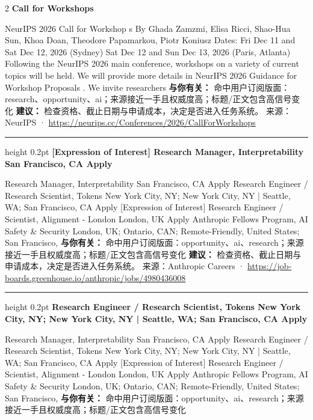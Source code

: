 \documentclass[10.5pt]{ctexart}
\begin{document}
\begin{multicols}{2}
{\large\bfseries Call for Workshops}\par
NeurIPS 2026 Call for Workshop s By Ghada Zamzmi, Elisa Ricci, Shao-Hua Sun, Khoa Doan, Theodore Papamarkou, Piotr Koniusz Dates: Fri Dec 11 and Sat Dec 12, 2026 (Sydney) Sat Dec 12 and Sun Dec 13, 2026 (Paris, Atlanta) Following the NeurIPS 2026 main conference, workshops on a variety of current topics will be held. We will provide more details in NeurIPS 2026 Guidance for Workshop Proposals . We invite researchers 
\textbf{与你有关：} 命中用户订阅版面：research、opportunity、ai；来源接近一手且权威度高；标题/正文包含高信号变化
\textbf{建议：} 检查资格、截止日期与申请成本，决定是否进入任务系统。
{\footnotesize\color{ormuted} 来源：NeurIPS · \url{https://neurips.cc/Conferences/2026/CallForWorkshops}}
\vspace{2mm}
\hrule height 0.2pt
\vspace{2mm}
{\large\bfseries [Expression of Interest] Research Manager, Interpretability San Francisco, CA Apply}\par
[Expression of Interest] Research Manager, Interpretability San Francisco, CA Apply Research Engineer / Research Scientist, Tokens New York City, NY; New York City, NY | Seattle, WA; San Francisco, CA Apply [Expression of Interest] Research Engineer / Scientist, Alignment - London London, UK Apply Anthropic Fellows Program, AI Safety \& Security London, UK; Ontario, CAN; Remote-Friendly, United States; San Francisco, 
\textbf{与你有关：} 命中用户订阅版面：opportunity、ai、research；来源接近一手且权威度高；标题/正文包含高信号变化
\textbf{建议：} 检查资格、截止日期与申请成本，决定是否进入任务系统。
{\footnotesize\color{ormuted} 来源：Anthropic Careers · \url{https://job-boards.greenhouse.io/anthropic/jobs/4980436008}}
\vspace{2mm}
\hrule height 0.2pt
\vspace{2mm}
{\large\bfseries Research Engineer / Research Scientist, Tokens New York City, NY; New York City, NY | Seattle, WA; San Francisco, CA Apply}\par
[Expression of Interest] Research Manager, Interpretability San Francisco, CA Apply Research Engineer / Research Scientist, Tokens New York City, NY; New York City, NY | Seattle, WA; San Francisco, CA Apply [Expression of Interest] Research Engineer / Scientist, Alignment - London London, UK Apply Anthropic Fellows Program, AI Safety \& Security London, UK; Ontario, CAN; Remote-Friendly, United States; San Francisco, 
\textbf{与你有关：} 命中用户订阅版面：opportunity、ai、research；来源接近一手且权威度高；标题/正文包含高信号变化

\end{multicols}
\end{document}
